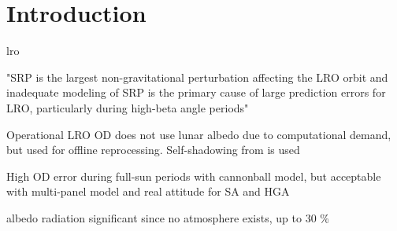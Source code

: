 \section{Introduction}
\gls{lro}

"SRP is the largest non-gravitational perturbation affecting the LRO orbit and inadequate modeling of SRP is the primary cause of large prediction errors for LRO, particularly during high-beta angle periods"~\cite{Slojkowski2015}

Operational LRO OD does not use lunar albedo due to computational demand, but used for offline reprocessing. Self-shadowing from \citeauthor{Mazarico2009} is used~\cite{Nicholson2010}

High OD error during full-sun periods with cannonball model, but acceptable with multi-panel model and real attitude for SA and HGA~\cite[]{Slojkowski2014}

albedo radiation significant since no atmosphere exists, up to 30 \%~\cite{Floberghagen1999}
